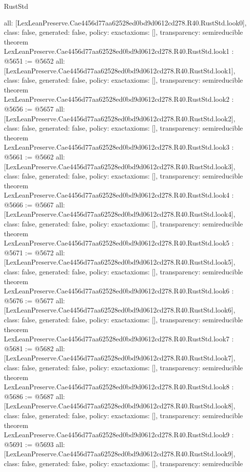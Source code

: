 \begin{lexlean}{RustStd}
\begin{coremodule}
{  all: [LexLeanPreserve.Cae4456d77aa62528ed0bd9d0612cd278.R40.RustStd.look0],
  class: false,
  generated: false,
  policy: exact{axioms: []},
  transparency: semireducible
}
theorem LexLeanPreserve.Cae4456d77aa62528ed0bd9d0612cd278.R40.RustStd.look1 : @5651 := @5652 {
  all: [LexLeanPreserve.Cae4456d77aa62528ed0bd9d0612cd278.R40.RustStd.look1],
  class: false,
  generated: false,
  policy: exact{axioms: []},
  transparency: semireducible
}
theorem LexLeanPreserve.Cae4456d77aa62528ed0bd9d0612cd278.R40.RustStd.look2 : @5656 := @5657 {
  all: [LexLeanPreserve.Cae4456d77aa62528ed0bd9d0612cd278.R40.RustStd.look2],
  class: false,
  generated: false,
  policy: exact{axioms: []},
  transparency: semireducible
}
theorem LexLeanPreserve.Cae4456d77aa62528ed0bd9d0612cd278.R40.RustStd.look3 : @5661 := @5662 {
  all: [LexLeanPreserve.Cae4456d77aa62528ed0bd9d0612cd278.R40.RustStd.look3],
  class: false,
  generated: false,
  policy: exact{axioms: []},
  transparency: semireducible
}
theorem LexLeanPreserve.Cae4456d77aa62528ed0bd9d0612cd278.R40.RustStd.look4 : @5666 := @5667 {
  all: [LexLeanPreserve.Cae4456d77aa62528ed0bd9d0612cd278.R40.RustStd.look4],
  class: false,
  generated: false,
  policy: exact{axioms: []},
  transparency: semireducible
}
theorem LexLeanPreserve.Cae4456d77aa62528ed0bd9d0612cd278.R40.RustStd.look5 : @5671 := @5672 {
  all: [LexLeanPreserve.Cae4456d77aa62528ed0bd9d0612cd278.R40.RustStd.look5],
  class: false,
  generated: false,
  policy: exact{axioms: []},
  transparency: semireducible
}
theorem LexLeanPreserve.Cae4456d77aa62528ed0bd9d0612cd278.R40.RustStd.look6 : @5676 := @5677 {
  all: [LexLeanPreserve.Cae4456d77aa62528ed0bd9d0612cd278.R40.RustStd.look6],
  class: false,
  generated: false,
  policy: exact{axioms: []},
  transparency: semireducible
}
theorem LexLeanPreserve.Cae4456d77aa62528ed0bd9d0612cd278.R40.RustStd.look7 : @5681 := @5682 {
  all: [LexLeanPreserve.Cae4456d77aa62528ed0bd9d0612cd278.R40.RustStd.look7],
  class: false,
  generated: false,
  policy: exact{axioms: []},
  transparency: semireducible
}
theorem LexLeanPreserve.Cae4456d77aa62528ed0bd9d0612cd278.R40.RustStd.look8 : @5686 := @5687 {
  all: [LexLeanPreserve.Cae4456d77aa62528ed0bd9d0612cd278.R40.RustStd.look8],
  class: false,
  generated: false,
  policy: exact{axioms: []},
  transparency: semireducible
}
theorem LexLeanPreserve.Cae4456d77aa62528ed0bd9d0612cd278.R40.RustStd.look9 : @5691 := @5693 {
  all: [LexLeanPreserve.Cae4456d77aa62528ed0bd9d0612cd278.R40.RustStd.look9],
  class: false,
  generated: false,
  policy: exact{axioms: []},
  transparency: semireducible
}
\end{coremodule}
\end{lexlean}
